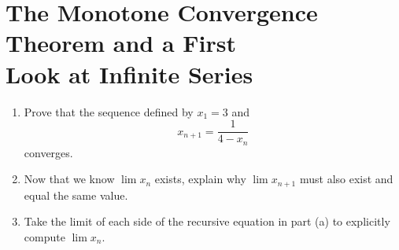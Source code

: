 \documentclass{lew98_solutions}
\begin{document}
\section[The Monotone Convergence Theorem and a First Look at Infinite Series]{The Monotone Convergence Theorem and a First\\ Look at Infinite Series}
\label{sec:2.4}

\begin{exercise}
\label{ex:2.4.1}
    \begin{enumerate}
        \item Prove that the sequence defined by \( x_1 = 3 \) and
        \[
            x_{n+1} = \frac{1}{4 - x_n}
        \]
        converges.

        \item Now that we know \( \lim x_n \) exists, explain why \( \lim x_{n+1} \) must also exist and equal the same value.

        \item Take the limit of each side of the recursive equation in part (a) to explicitly compute \( \lim x_n \).
    \end{enumerate}
\end{exercise}
\end{document}
